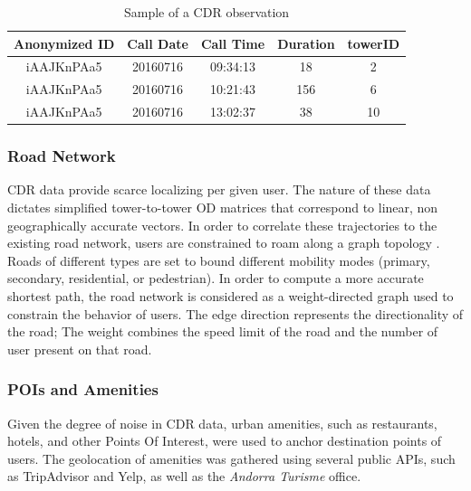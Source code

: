 {{        \begin{table}
            \begin{center}
                \begin{tabular}{c|cccc}
                    \hline
                    Anonymized ID & Call Date & Call Time & Duration & towerID \\
                    \hline
                    iAAJKnPAa5    & 20160716  & 09:34:13  & 18       & 2       \\
                    iAAJKnPAa5    & 20160716  & 10:21:43  & 156      & 6       \\
                    iAAJKnPAa5    & 20160716  & 13:02:37  & 38       & 10      \\
                    \hline
                \end{tabular}
                \caption{Sample of a CDR observation}
                \label{f:CDRSample}
            \end{center}
        \end{table}


        \subsubsection{Road Network}
        {
            CDR data provide scarce localizing per given user. The nature of these data dictates simplified tower-to-tower OD matrices that correspond to linear, non geographically accurate vectors. In order to correlate these trajectories to the existing road network, users are constrained to roam along a graph topology \cite{Gonzalez2008}. Roads of different types are set to bound different mobility modes (primary, secondary, residential, or pedestrian). In order to compute a more accurate shortest path, the road network is considered as a weight-directed graph used to constrain the behavior of users. The edge direction represents the directionality of the road; The weight combines the speed limit of the road and the number of user present on that road.
        }

        \subsubsection{POIs and Amenities}
        {
            Given the degree of noise in CDR data, urban amenities, such as restaurants, hotels, and other Points Of Interest, were used to anchor destination points of users. The geolocation of amenities was gathered using several public APIs, such as TripAdvisor and Yelp, as well as the \textit{Andorra Turisme} office.
        }
    }

}

